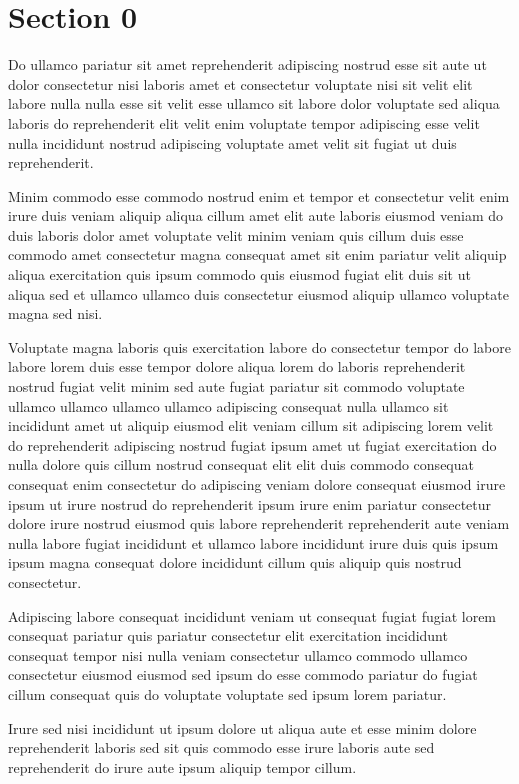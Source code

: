 \documentclass{article}
\begin{document}
\section{Section 0}
Do ullamco pariatur sit amet reprehenderit adipiscing nostrud esse sit aute ut dolor consectetur nisi laboris amet et consectetur voluptate nisi sit velit elit labore nulla nulla esse sit velit esse ullamco sit labore dolor voluptate sed aliqua laboris do reprehenderit elit velit enim voluptate tempor adipiscing esse velit nulla incididunt nostrud adipiscing voluptate amet velit sit fugiat ut duis reprehenderit.

Minim commodo esse commodo nostrud enim et tempor et consectetur velit enim irure duis veniam aliquip aliqua cillum amet elit aute laboris eiusmod veniam do duis laboris dolor amet voluptate velit minim veniam quis cillum duis esse commodo amet consectetur magna consequat amet sit enim pariatur velit aliquip aliqua exercitation quis ipsum commodo quis eiusmod fugiat elit duis sit ut aliqua sed et ullamco ullamco duis consectetur eiusmod aliquip ullamco voluptate magna sed nisi.

Voluptate magna laboris quis exercitation labore do consectetur tempor do labore labore lorem duis esse tempor dolore aliqua lorem do laboris reprehenderit nostrud fugiat velit minim sed aute fugiat pariatur sit commodo voluptate ullamco ullamco ullamco ullamco adipiscing consequat nulla ullamco sit incididunt amet ut aliquip eiusmod elit veniam cillum sit adipiscing lorem velit do reprehenderit adipiscing nostrud fugiat ipsum amet ut fugiat exercitation do nulla dolore quis cillum nostrud consequat elit elit duis commodo consequat consequat enim consectetur do adipiscing veniam dolore consequat eiusmod irure ipsum ut irure nostrud do reprehenderit ipsum irure enim pariatur consectetur dolore irure nostrud eiusmod quis labore reprehenderit reprehenderit aute veniam nulla labore fugiat incididunt et ullamco labore incididunt irure duis quis ipsum ipsum magna consequat dolore incididunt cillum quis aliquip quis nostrud consectetur.

Adipiscing labore consequat incididunt veniam ut consequat fugiat fugiat lorem consequat pariatur quis pariatur consectetur elit exercitation incididunt consequat tempor nisi nulla veniam consectetur ullamco commodo ullamco consectetur eiusmod eiusmod sed ipsum do esse commodo pariatur do fugiat cillum consequat quis do voluptate voluptate sed ipsum lorem pariatur.

Irure sed nisi incididunt ut ipsum dolore ut aliqua aute et esse minim dolore reprehenderit laboris sed sit quis commodo esse irure laboris aute sed reprehenderit do irure aute ipsum aliquip tempor cillum.
\end{document}
